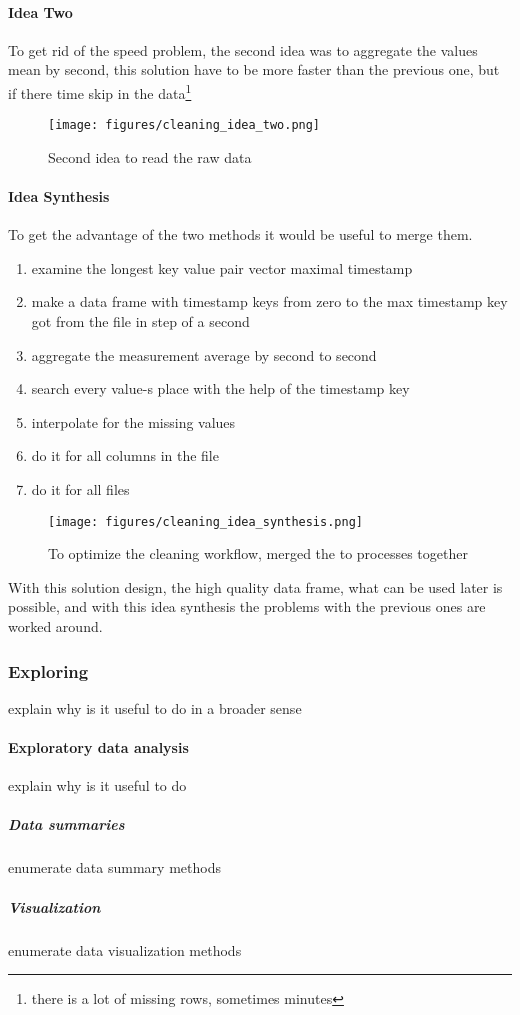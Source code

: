 		\paragraph{Idea Two}
To get rid of the speed problem, the second idea was to aggregate the values mean by second, this solution have to be more faster than the previous one, but if there time skip in the data\footnote{there is a lot of missing rows, sometimes minutes}
			\begin{figure}[!ht]
			\centering
			\texttt{[image: figures/cleaning\_idea\_two.png]}
			\caption{Second idea to read the raw data} 
			\end{figure}
		\paragraph{Idea Synthesis}
To get the advantage of the two methods it would be useful to merge them.
\begin{enumerate}
	\item{examine the longest key value pair vector maximal timestamp} 
	\item{make a data frame with timestamp keys from zero to the max timestamp key got from the file in step of a second}
	\item{aggregate the measurement average by second to second}
	\item{search every value-s place with the help of the timestamp key}
	\item{interpolate for the missing values}
	\item{do it for all columns in the file}
	\item{do it for all files}
\end{enumerate} 
			\begin{figure}[!ht]
			\centering
			\texttt{[image: figures/cleaning\_idea\_synthesis.png]}
			\caption{To optimize the cleaning workflow, merged the to processes together} 
			\end{figure}
\noindent
With this solution design, the high quality data frame, what can be used later is possible, and with this idea synthesis the problems with the previous ones are worked around.
	\subsubsection{Exploring}
	explain why is it useful to do in a broader sense
		\paragraph{Exploratory data analysis}
			explain why is it useful to do
			\subparagraph{Data summaries}
			enumerate data summary methods
			\subparagraph{Visualization}
			enumerate data visualization methods
